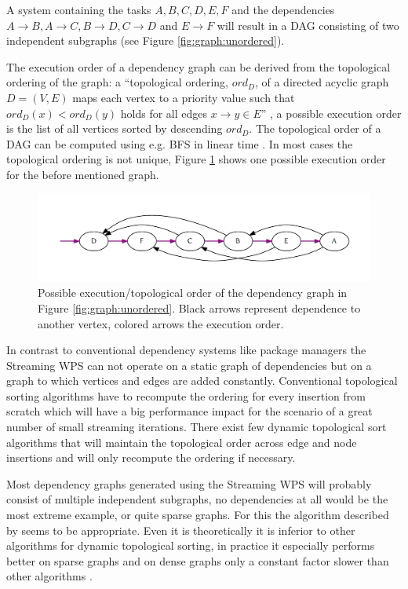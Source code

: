 		A system containing the tasks $A, B, C, D, E, F$ and the dependencies $A\rightarrow B, A\rightarrow C, B\rightarrow D, C\rightarrow D$ and $E\rightarrow F$ will result in a \ac{DAG} consisting of two independent subgraphs (see Figure \ref{fig:graph:unordered}).

		The execution order of a dependency graph can be derived from the topological ordering of the graph: a ``topological ordering, $ord_D$, of a directed acyclic graph $D = (V, E)$ maps each vertex to a priority value such that $ord_{D}(x) < ord_{D}(y)$ holds for all edges $x \rightarrow y \in E$'' \citep{pearce2007dynamic}, a possible execution order is the list of all vertices sorted by descending $ord_D$. The topological order of a \ac{DAG} can be computed using e.g. \ac{BFS} in linear time \citep{cormen2001introduction}. In most cases the topological ordering is not unique, Figure \ref{fig:graph:ordered} shows one possible execution order for the before mentioned graph.

		\begin{figure}[!htb]
			\centering
			\includegraphics[width=1\textwidth]{figures/ordered-graph.pdf} %
			\caption{\label{fig:graph:ordered}Possible execution/topological order of the dependency graph in Figure \ref{fig:graph:unordered}. Black arrows represent dependence to another vertex, colored arrows the execution order.}
		\end{figure}

		In contrast to conventional dependency systems like package managers the Streaming \ac{WPS} can not operate on a static graph of dependencies but on a graph to which vertices and edges are added constantly. Conventional topological sorting algorithms have to recompute the ordering for every insertion from scratch which will have a big performance impact for the scenario of a great number of small streaming iterations. There exist few dynamic topological sort algorithms that will maintain the topological order across edge and node insertions and will only recompute the ordering if necessary.

		Most dependency graphs generated using the Streaming \ac{WPS} will probably consist of multiple independent subgraphs, no dependencies at all would be the most extreme example, or quite sparse graphs. For this the algorithm described by \citet{pearce2007dynamic} seems to be appropriate. Even it is theoretically it is inferior to other algorithms for dynamic topological sorting, in practice it especially performs better on sparse graphs and on dense graphs only a constant factor slower than other algorithms \citep{pearce2007dynamic}. %

